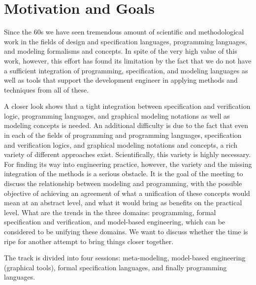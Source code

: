 
\section{Motivation and Goals}

Since the 60s we have seen tremendous amount of scientific and methodological work in the fields of design and specification languages, programming languages, and modeling formalisms and concepts. In spite of the very high value of this work, however, this effort has found its limitation by the fact that we do not have a sufficient integration of programming, specification, and modeling languages as well as tools that support the development engineer in applying methods and techniques from all of these.

A closer look shows that a tight integration between specification and verification logic, programming languages, and graphical modeling notations as well as modeling concepts is needed. An additional difficulty is due to the fact that even in each of the fields of programming and programming languages, specification and verification logics, and graphical modeling notations and concepts, a rich variety of different approaches exist. Scientifically, this variety is highly necessary. For finding its way into engineering practice, however, the variety and the missing integration of the methods is a serious obstacle. It is the goal of the meeting to discuss the relationship between modeling and programming, with the possible objective of achieving an agreement of what a unification of these concepts would mean at an abstract level, and what it would bring as benefits on the practical level. What are the trends in the three domains: programming, formal specification and verification, and model-based engineering, which can be considered to be unifying these domains. We want to discuss whether the time is ripe for another attempt to bring things closer together.

The track is divided into four sessions: meta-modeling, model-based engineering (graphical tools), formal specification languages, and finally programming languages.

